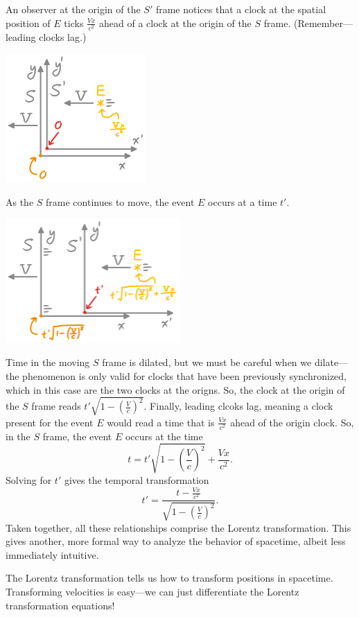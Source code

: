 \documentclass[10pt,a4paper,oneside]{book}
\begin{document}
An observer at the origin of the $S'$ frame notices that a clock at the spatial position of $E$ ticks $\frac{Vx}{c^2}$ ahead of a clock at the origin of the $S$ frame.
(Remember---leading clocks lag.)
\begin{center}
    \includegraphics[width=0.4\textwidth]{movFramesTemp1.png}
\end{center}
As the $S$ frame continues to move, the event $E$ occurs at a time $t'$.
\begin{center}
    \includegraphics[width=0.5\textwidth]{movFramesTemp2.png}
\end{center}
Time in the moving $S$ frame is dilated, but we must be careful when we dilate---the phenomenon is only valid for clocks that have been previously synchronized, which in this case are the two clocks at the origns.
So, the clock at the origin of the $S$ frame reads $t' \sqrt{1 - \left( \frac{V}{c} \right)^2}$.
Finally, leading clcoks lag, meaning a clock present for the event $E$ would read a time that is $\frac{Vx}{c^2}$ ahead of the origin clock.
So, in the $S$ frame, the event $E$ occurs at the time
\[ t = t' \sqrt{1 - \left( \frac{V}{c} \right)^2} + \frac{Vx}{c^2}. \]
Solving for $t'$ gives the temporal transformation
\[ t' = \frac{t - \frac{Vx}{c^2}}{\sqrt{1 - \left( \frac{V}{c} \right)^2}}. \]
Taken together, all these relationships comprise the Lorentz transformation.
This gives another, more formal way to analyze the behavior of spacetime, albeit less immediately intuitive.

The Lorentz transformation tells us how to transform positions in spacetime.
Transforming velocities is easy---we can just differentiate the Lorentz transformation equations!
\end{document}
